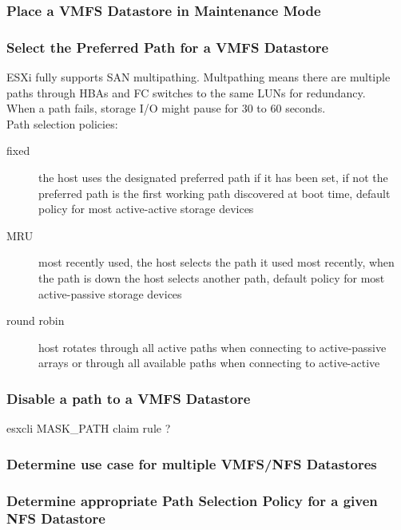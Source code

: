\subsubsection{Place a VMFS Datastore in Maintenance Mode}

\subsubsection{Select the Preferred Path for a VMFS Datastore}

ESXi fully supports SAN multipathing. Multpathing means there are multiple
paths through HBAs and FC switches to the same LUNs for redundancy.\\

When a path fails, storage I/O might pause for 30 to 60 seconds.\\

Path selection policies:

\begin{description}

\item[fixed]
the host uses the designated preferred path if it has been set, if not the
preferred path is the first working path discovered at boot time, default
policy for most active-active storage devices

\item[MRU]
most recently used, the host selects the path it used most recently, when the
path is down the host selects another path, default policy for most
active-passive storage devices

\item[round robin]
host rotates through all active paths when connecting to active-passive arrays
or through all available paths when connecting to active-active

\end{description}
 
\subsubsection{Disable a path to a VMFS Datastore}

esxcli MASK\_PATH claim rule ?
 
\subsubsection{Determine use case for multiple VMFS/NFS Datastores}

\subsubsection{Determine appropriate Path Selection Policy for a given NFS Datastore}
